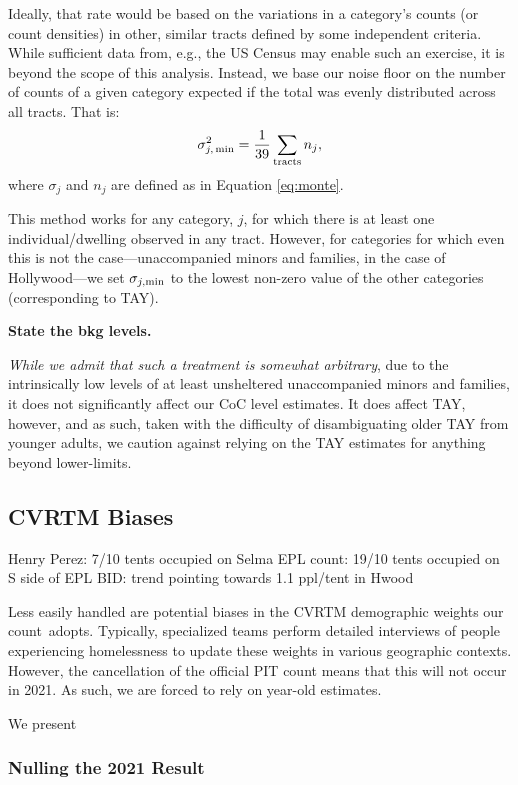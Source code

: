 \documentclass[11pt,twocolumn]{article}
\def\bfr{\bf\color{red}}
\def\Count{count}
\begin{document}
Ideally, that rate would be based on the variations in a category's counts (or count densities) in other, 
similar tracts defined by some independent criteria. While sufficient data from, e.g., the US Census 
may enable such an exercise, it is beyond the scope of this analysis. Instead, we base our noise floor 
on the number of counts of a given category expected if the total was evenly distributed across 
all tracts. That is:
\begin{equation}
	\sigma_{j,\,\rm min}^{2} = \frac{1}{39}\sum_{\rm tracts}n_{j},
\end{equation}
where $\sigma_{j}$ and $n_{j}$ are defined as in Equation \ref{eq:monte}.

This method works for any category, $j$, for which there is at least one individual/dwelling observed in any 
tract. However, for categories for which even this is not the case---unaccompanied minors and families, in the
case of Hollywood---we set $\sigma_{j, \rm min}$ to the lowest non-zero value of the other categories
(corresponding to TAY).

{\bfr State the bkg levels.}

{\it While we admit that such a treatment is 
somewhat arbitrary}, due to the intrinsically low levels of at least unsheltered unaccompanied minors 
and families, it does not significantly affect our CoC level estimates. It does affect TAY, however, and
as such, taken with the difficulty of disambiguating older TAY from younger adults, we caution against 
relying on the TAY estimates for anything beyond lower-limits.

\subsection{CVRTM Biases}
\label{sec:CVRTM}

Henry Perez: 7/10 tents occupied on Selma
EPL count: 19/10 tents occupied on S side of EPL
BID: trend pointing towards 1.1 ppl/tent in Hwood

Less easily handled are potential biases in the CVRTM demographic weights our \Count\ adopts.
Typically, specialized teams perform detailed interviews of people experiencing homelessness to update 
these weights in various geographic contexts. However, the cancellation of the official PIT count means
that this will not occur in 2021. As such, we are forced to rely on year-old estimates.

We present 

\subsubsection{Nulling the 2021 Result}
\label{sec:nullOut}
\end{document}
